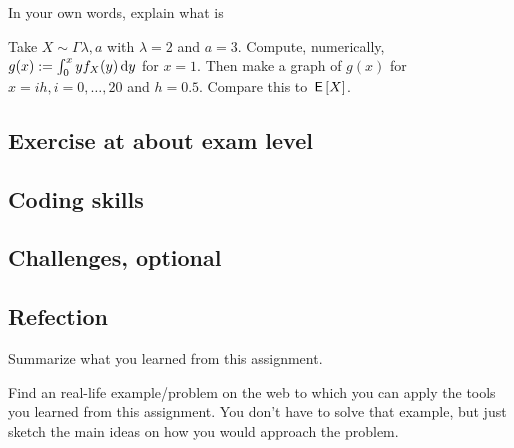 \documentclass[../../assignments/assignments]{subfiles}
\begin{document}
\begin{exercise}
In your own words, explain what is
\begin{hint}
\end{hint}
\begin{solution}
\end{solution}
\end{exercise}

\begin{exercise}
Take $X\sim \Gamma{\lambda, a}$ with $\lambda=2$ and $a=3$. Compute, numerically, $g(x) := \int_0^x y f_X(y) \,\textrm{d}y$ for $x=1$. Then make a graph of $g(x)$ for $x=ih, i=0, \ldots, 20$ and $h=0.5$. Compare this to $\,\mathsf{E}\left[X\right]$.
\begin{hint}
\end{hint}
\begin{solution}
\end{solution}
\end{exercise}




\subsection{Exercise at about exam level}



\subsection{Coding skills}


\subsection{Challenges, optional}

\subsection{Refection}
\label{sec:refection}

\begin{exercise}
Summarize what you learned from this assignment.
\begin{hint}
\end{hint}
\begin{solution}
\end{solution}
\end{exercise}

\begin{exercise}
Find an real-life example/problem on the web to which you can apply the tools you learned from this assignment. You don't have to solve that example, but just sketch the main ideas on how you would approach the problem.
\begin{hint}
\end{hint}
\begin{solution}
\end{solution}
\end{exercise}
\end{document}
